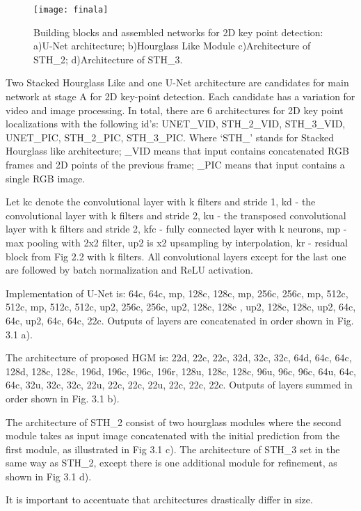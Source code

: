 \begin{figure}
\caption{Building blocks and assembled networks for 2D key point detection: a)U-Net architecture; b)Hourglass Like Module c)Architecture of STH\_2; d)Architecture of STH\_3.}
\centering
\texttt{[image: finala]}
\end{figure}

Two Stacked Hourglass Like and one U-Net architecture are candidates for main network at stage A for 2D key-point detection. Each candidate has a variation for video and image processing. In total, there are 6 architectures for 2D key point localizations with the following id’s: UNET\_VID, STH\_2\_VID, STH\_3\_VID, UNET\_PIC, STH\_2\_PIC, STH\_3\_PIC. Where ‘STH\_’ stands for Stacked Hourglass like architecture; \_VID means that input contains concatenated RGB frames and 2D points of the previous frame;  \_PIC means that input contains a single RGB image.

Let kc denote the convolutional layer with k filters and stride 1, kd - the convolutional layer with k filters and stride 2, ku - the transposed convolutional layer with k filters and stride 2, kfc - fully connected layer with k neurons, mp - max pooling with 2x2 filter, up2 is x2 upsampling by interpolation, kr - residual block from Fig 2.2 with k filters. All convolutional layers except for the last one are followed by batch normalization and ReLU activation.

Implementation of U-Net is: 64c, 64c, mp, 128c, 128c, mp, 256c, 256c, mp, 512c, 512c, mp, 512c, 512c, up2, 256c, 256c, up2, 128c, 128c , up2, 128c, 128c, up2, 64c, 64c, up2, 64c, 64c, 22c. Outputs of layers are concatenated in order shown in Fig. 3.1 a).

The architecture of proposed HGM is: 22d, 22c, 22c, 32d, 32c, 32c, 64d, 64c, 64c, 128d, 128c, 128c, 196d, 196c, 196c, 196r, 128u, 128c, 128c, 96u, 96c, 96c, 64u, 64c, 64c, 32u, 32c, 32c, 22u, 22c, 22c, 22u, 22c, 22c, 22c. Outputs of layers summed in order shown in Fig. 3.1 b). 

The architecture of STH\_2 consist of two hourglass modules where the second module takes as input image concatenated with the initial prediction from the first module, as illustrated in Fig 3.1 c). The architecture of STH\_3 set in the same way as STH\_2, except there is one additional module for refinement, as shown in Fig 3.1 d).

It is important to accentuate that architectures drastically differ in size. 

